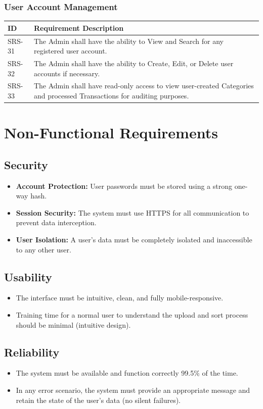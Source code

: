\subsubsection{User Account Management}
\begin{longtable}{|p{2.5cm}|p{12cm}|}
	\hline
	\textbf{ID} & \textbf{Requirement Description} \\
	\hline
	SRS-31 & The Admin shall have the ability to View and Search for any registered user account. \\ \hline
	SRS-32 & The Admin shall have the ability to Create, Edit, or Delete user accounts if necessary. \\ \hline
	SRS-33 & The Admin shall have read-only access to view user-created Categories and processed Transactions for auditing purposes. \\ \hline
\end{longtable}

\section{Non-Functional Requirements}

\subsection{Security}
\begin{itemize}
	\item \textbf{Account Protection:} User passwords must be stored using a strong one-way hash.
	\item \textbf{Session Security:} The system must use HTTPS for all communication to prevent data interception.
	\item \textbf{User Isolation:} A user's data must be completely isolated and inaccessible to any other user.
\end{itemize}

\subsection{Usability}
\begin{itemize}
	\item The interface must be intuitive, clean, and fully mobile-responsive.
	\item Training time for a normal user to understand the upload and sort process should be minimal (intuitive design).
\end{itemize}

\subsection{Reliability}
\begin{itemize}
	\item The system must be available and function correctly 99.5\% of the time.
	\item In any error scenario, the system must provide an appropriate message and retain the state of the user's data (no silent failures).
\end{itemize}

